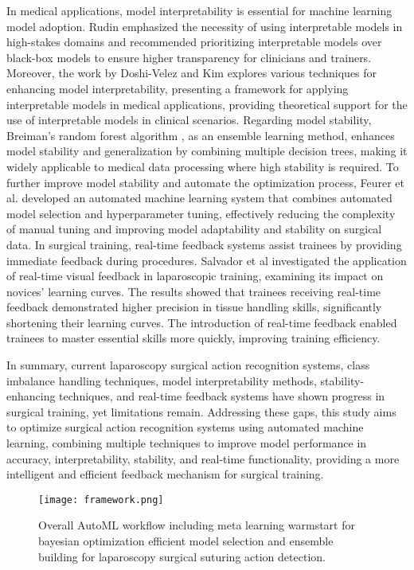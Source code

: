 In medical applications, model interpretability is essential for machine learning model adoption. Rudin \cite{rudin2019stop} emphasized the necessity of using interpretable models in high-stakes domains and recommended prioritizing interpretable models over black-box models to ensure higher transparency for clinicians and trainers. Moreover, the work by Doshi-Velez and Kim \cite{doshi2017towards} explores various techniques for enhancing model interpretability, presenting a framework for applying interpretable models in medical applications, providing theoretical support for the use of interpretable models in clinical scenarios. Regarding model stability, Breiman's random forest algorithm \cite{breiman2001random}, as an ensemble learning method, enhances model stability and generalization by combining multiple decision trees, making it widely applicable to medical data processing where high stability is required. To further improve model stability and automate the optimization process, Feurer et al. \cite{feurer2015efficient} developed an automated machine learning system that combines automated model selection and hyperparameter tuning, effectively reducing the complexity of manual tuning and improving model adaptability and stability on surgical data. In surgical training, real-time feedback systems assist trainees by providing immediate feedback during procedures. Salvador et al \cite{salvador2024effects} investigated the application of real-time visual feedback in laparoscopic training, examining its impact on novices' learning curves. The results showed that trainees receiving real-time feedback demonstrated higher precision in tissue handling skills, significantly shortening their learning curves. The introduction of real-time feedback enabled trainees to master essential skills more quickly, improving training efficiency.


In summary, current laparoscopy surgical action recognition systems, class imbalance handling techniques, model interpretability methods, stability-enhancing techniques, and real-time feedback systems have shown progress in surgical training, yet limitations remain. Addressing these gaps, this study aims to optimize surgical action recognition systems using automated machine learning, combining multiple techniques to improve model performance in accuracy, interpretability, stability, and real-time functionality, providing a more intelligent and efficient feedback mechanism for surgical training.


\begin{figure*}[h!]
	\centering
	\texttt{[image: framework.png]}
	\caption{Overall AutoML workflow including meta learning warmstart for bayesian optimization efficient model selection and ensemble building for laparoscopy surgical suturing action detection. 
	}
	\label{framework}
\end{figure*}